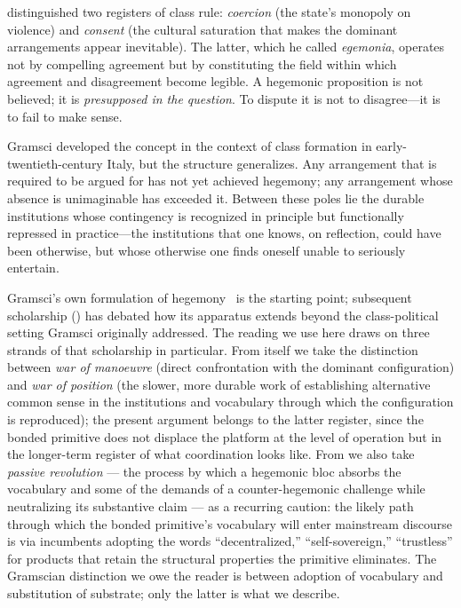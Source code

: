 \documentclass[11pt,a4paper]{article}
\theoremstyle{remark}
\begin{document}
\citet{gramsci1971} distinguished two registers of class rule:
\emph{coercion} (the state's monopoly on violence) and
\emph{consent} (the cultural saturation that makes the dominant
arrangements appear inevitable). The latter, which he called
\emph{egemonia}, operates not by compelling agreement but by
constituting the field within which agreement and disagreement
become legible. A hegemonic proposition is not believed; it is
\emph{presupposed in the question}. To dispute it is not to
disagree---it is to fail to make sense.

Gramsci developed the concept in the context of class formation in
early-twentieth-century Italy, but the structure generalizes. Any
arrangement that is required to be argued for has not yet achieved
hegemony; any arrangement whose absence is unimaginable has
exceeded it. Between these poles lie the durable institutions whose
contingency is recognized in principle but functionally repressed
in practice---the institutions that one knows, on reflection, could
have been otherwise, but whose otherwise one finds oneself unable
to seriously entertain.

Gramsci's own formulation of hegemony~\citep{gramsci1971} is the
starting point; subsequent scholarship
(\citealt{anderson1976antinomies,hall1986gramsci,
hall1988hardroad,laclau_mouffe_1985}) has debated how its
apparatus extends beyond the class-political setting Gramsci
originally addressed. The reading we use here draws on three
strands of that scholarship in particular. From \citet{gramsci1971}
itself we take the distinction between \emph{war of manoeuvre}
(direct confrontation with the dominant configuration) and
\emph{war of position} (the slower, more durable work of
establishing alternative common sense in the institutions and
vocabulary through which the configuration is reproduced); the
present argument belongs to the latter register, since the bonded
primitive does not displace the platform at the level of operation
but in the longer-term register of what coordination looks like.
From \citeauthor{gramsci1971} we also take \emph{passive revolution} ---
the process by which a hegemonic bloc absorbs the vocabulary and
some of the demands of a counter-hegemonic challenge while
neutralizing its substantive claim --- as a recurring caution: the
likely path through which the bonded primitive's vocabulary will
enter mainstream discourse is via incumbents adopting the words
``decentralized,'' ``self-sovereign,'' ``trustless'' for products
that retain the structural properties the primitive eliminates.
The Gramscian distinction we owe the reader is between adoption of
vocabulary and substitution of substrate; only the latter is
what we describe.
\end{document}
